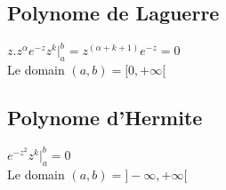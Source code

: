 \documentclass[12pt]{book}
\begin{document}
            \subsection*{Polynome de Laguerre}
                $z.z^\alpha e^{-z}z^k|_a^b =z^(\alpha + k +1)e^{-z}=0$ \\
                Le domain $(a,b) = [0,+\infty[$
            \subsection*{Polynome d'Hermite}
                $e^{-z^2}z^k|_a^b =0$ \\
                Le domain $(a,b) = ]-\infty , +\infty[$



            
            
            



        
            
\end{document}
